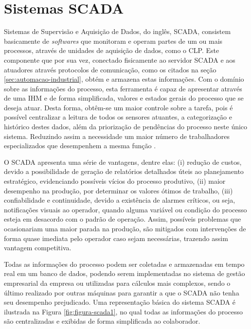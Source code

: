 \chapter{Sistemas SCADA}
\label{chap:scada}

    Sistemas de Supervisão e Aquisição de Dados, do inglês, \gls{SCADA}, consistem basicamente de \textit{softwares} que monitoram e operam partes de um ou mais processos, através de unidades de aquisição de dados, como o \gls{CLP}. Este componente que por sua vez, conectado fisicamente ao servidor \gls{SCADA} e aos atuadores através protocolos de comunicação, como os citados na seção \ref{sec:automacao-industrial}, obtém e armazena estas informações. Com o domínio sobre as informações do processo, esta ferramenta é capaz de apresentar através de uma \gls{IHM} e de forma simplificada, valores e estados gerais do processo que se deseja atuar. Desta forma, obtêm-se um maior controle sobre a tarefa, pois é possível centralizar a leitura de todos os sensores atuantes, a categorização e histórico destes dados, além da priorização de pendências do processo neste único sistema. Reduzindo assim a necessidade um maior número de trabalhadores especializados que desempenhem a mesma função \cite{WhatScada}.
    
    O \gls{SCADA} apresenta uma série de vantagens, dentre elas: (i) redução de custos, devido a possibilidade de geração de relatórios detalhados úteis ao planejamento estratégico, evidenciando possíveis vícios do processo produtivo, (ii) maior desempenho na produção, por determinar os valores ótimos de trabalho, (iii) confiabilidade e continuidade, devido a existência de alarmes críticos, ou seja, notificações visuais ao operador, quando alguma variável ou condição do processo esteja em desacordo com o padrão de operação. Assim, possíveis problemas que ocasionariam uma maior parada na produção, são mitigados com intervenções de forma quase imediata pelo operador caso sejam necessárias, trazendo assim vantagem competitiva.
    
    Todas as informações do processo podem ser coletadas e armazenadas em tempo real em um banco de dados, podendo serem implementadas no sistema de gestão empresarial da empresa ou utilizadas para cálculos mais complexos, sendo o último realizado por outras máquinas para garantir a que o \gls{SCADA} não tenha seu desempenho prejudicado.
    Uma representação básica do sistema \gls{SCADA} é ilustrada na Figura \ref{fig:figura-scada1}, no qual todas as informações do processo são centralizadas e exibidas de forma simplificada ao colaborador.
    
